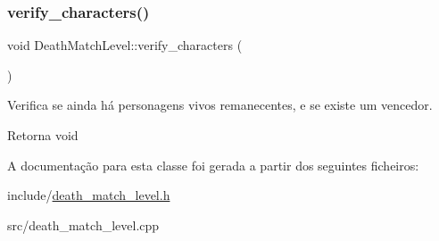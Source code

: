 \subsubsection{\texorpdfstring{verify\+\_\+characters()}{verify\_characters()}}
{\footnotesize\ttfamily void Death\+Match\+Level\+::verify\+\_\+characters (\begin{DoxyParamCaption}{ }\end{DoxyParamCaption})\hspace{0.3cm}{\ttfamily [protected]}}



Verifica se ainda há personagens vivos remanecentes, e se existe um vencedor. 

\begin{DoxyReturn}{Retorna}
void 
\end{DoxyReturn}


A documentação para esta classe foi gerada a partir dos seguintes ficheiros\+:\begin{DoxyCompactItemize}
\item 
include/\mbox{\hyperlink{death__match__level_8h}{death\+\_\+match\+\_\+level.\+h}}\item 
src/death\+\_\+match\+\_\+level.\+cpp\end{DoxyCompactItemize}
